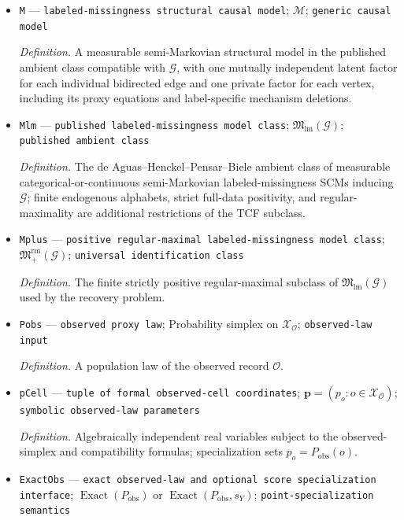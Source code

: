 \documentclass{article}
\begin{document}
\begin{itemize}
  \item \texttt{M} --- \texttt{labeled-\allowbreak{}missingness structural causal model}; \(\mathcal M\); \texttt{generic causal model}
  \par\smallskip\noindent\emph{Definition.} A measurable semi-Markovian structural model in the published ambient class compatible with \(\mathcal G\), with one mutually independent latent factor for each individual bidirected edge and one private factor for each vertex, including its proxy equations and label-specific mechanism deletions.
  \item \texttt{Mlm} --- \texttt{published labeled-\allowbreak{}missingness model class}; \(\mathfrak M_{\mathrm{lm}}(\mathcal G)\); \texttt{published ambient class}
  \par\smallskip\noindent\emph{Definition.} The de Aguas--Henckel--Pensar--Biele ambient class of measurable categorical-or-continuous semi-Markovian labeled-missingness SCMs inducing \(\mathcal G\); finite endogenous alphabets, strict full-data positivity, and regular-maximality are additional restrictions of the TCF subclass.
  \item \texttt{Mplus} --- \texttt{positive regular-\allowbreak{}maximal labeled-\allowbreak{}missingness model class}; \(\mathfrak M_{+}^{\mathrm{rm}}(\mathcal G)\); \texttt{universal identification class}
  \par\smallskip\noindent\emph{Definition.} The finite strictly positive regular-maximal subclass of \(\mathfrak M_{\mathrm{lm}}(\mathcal G)\) used by the recovery problem.
  \item \texttt{Pobs} --- \texttt{observed proxy law}; Probability simplex on \(\mathcal X_{\mathcal O}\); \texttt{observed-\allowbreak{}law input}
  \par\smallskip\noindent\emph{Definition.} A population law of the observed record \(\mathcal O\).
  \item \texttt{pCell} --- \texttt{tuple of formal observed-\allowbreak{}cell coordinates}; \(\mathbf p=(p_o:o\in\mathcal X_{\mathcal O})\); \texttt{symbolic observed-\allowbreak{}law parameters}
  \par\smallskip\noindent\emph{Definition.} Algebraically independent real variables subject to the observed-simplex and compatibility formulas; specialization sets \(p_o=P_{\mathrm{obs}}(o)\).
  \item \texttt{ExactObs} --- \texttt{exact observed-\allowbreak{}law and optional score specialization interface}; \(\operatorname{Exact}(P_{\mathrm{obs}})\) or \(\operatorname{Exact}(P_{\mathrm{obs}},s_Y)\); \texttt{point-\allowbreak{}specialization semantics}

\end{itemize}
\end{document}
